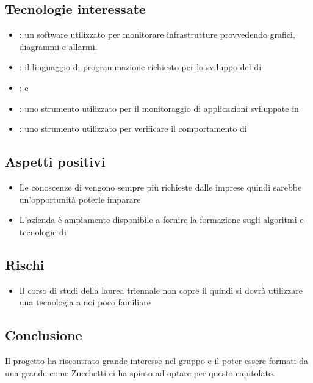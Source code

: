 \documentclass[../studio-di-fattibilita.tex]{subfiles}
\begin{document}
\subsection{Tecnologie interessate}%
\label{sub:tecnologie_interessate}
\begin{itemize}
  \item {}: un software  utilizzato per monitorare infrastrutture provvedendo grafici, diagrammi e allarmi.
  \item {}: il linguaggio di programmazione richiesto per lo sviluppo del  di 
  \item {}:  e 
  \item {}: uno strumento utilizzato per il monitoraggio di applicazioni sviluppate in 
  \item {}: uno strumento utilizzato per verificare il comportamento di 
\end{itemize}

\subsection{Aspetti positivi}%
\label{sub:aspetti_positivi}
\begin{itemize}
  \item Le conoscenze di  vengono sempre più richieste dalle imprese quindi sarebbe un’opportunità poterle imparare
  \item L’azienda è ampiamente disponibile a fornire la formazione sugli algoritmi e tecnologie di 
\end{itemize}

\subsection{Rischi}%
\label{sub:rischi}
\begin{itemize}
  \item Il corso di studi della laurea triennale non copre il  quindi si dovrà utilizzare una tecnologia a noi poco familiare
\end{itemize}

\subsection{Conclusione}%
\label{sub:conclusione}
Il progetto ha riscontrato grande interesse nel gruppo e il poter essere formati da una grande  come Zucchetti ci ha spinto ad optare per questo capitolato.
\end{document}
